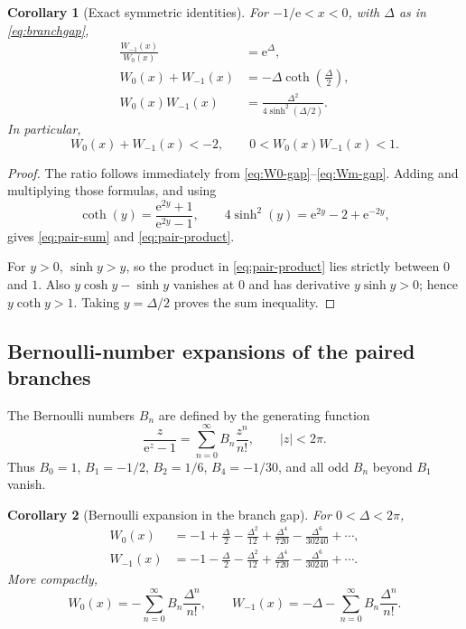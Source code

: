 \documentclass[11pt]{article}
\newtheorem{corollary}[corollary]{Corollary}
\theoremstyle{remark}
\newcommand{\Wz}{W_0}
\newcommand{\Wm}{W_{-1}}
\newcommand{\ee}{\mathrm e}
\begin{document}
\begin{corollary}[Exact symmetric identities]\label{cor:pair-symmetric}
For \(-1/\ee<x<0\), with \(\Delta\) as in
\eqref{eq:branchgap},
\begin{align}
 \frac{\Wm(x)}{\Wz(x)}&=\ee^\Delta,
 \label{eq:pair-ratio}\\
 \Wz(x)+\Wm(x)&=-\Delta\coth\left(\frac\Delta2\right),
 \label{eq:pair-sum}\\
 \Wz(x)\Wm(x)&=
 \frac{\Delta^2}{4\sinh^2(\Delta/2)}.
 \label{eq:pair-product}
\end{align}
In particular,
\begin{equation}\label{eq:pair-inequalities}
       \Wz(x)+\Wm(x)<-2,
       \qquad 0<\Wz(x)\Wm(x)<1.
\end{equation}
\end{corollary}

\begin{proof}
The ratio follows immediately from
\eqref{eq:W0-gap}--\eqref{eq:Wm-gap}.  Adding and multiplying those
formulas, and using
\[
 \coth(y)=\frac{\ee^{2y}+1}{\ee^{2y}-1},
 \qquad
 4\sinh^2(y)=\ee^{2y}-2+\ee^{-2y},
\]
gives \eqref{eq:pair-sum} and \eqref{eq:pair-product}.

For \(y>0\), \(\sinh y>y\), so the product in
\eqref{eq:pair-product} lies strictly between \(0\) and \(1\).  Also
\(y\cosh y-\sinh y\) vanishes at \(0\) and has derivative
\(y\sinh y>0\); hence \(y\coth y>1\).  Taking \(y=\Delta/2\)
proves the sum inequality.
\end{proof}

\subsection{Bernoulli-number expansions of the paired branches}

The Bernoulli numbers \(B_n\) are defined by the generating function
\begin{equation}\label{eq:bernoulli-gen}
       \frac{z}{\ee^z-1}
       =\sum_{n=0}^{\infty}B_n\frac{z^n}{n!},
       \qquad |z|<2\pi.
\end{equation}
Thus \(B_0=1\), \(B_1=-1/2\), \(B_2=1/6\),
\(B_4=-1/30\), and all odd \(B_n\) beyond \(B_1\) vanish.

\begin{corollary}[Bernoulli expansion in the branch gap]
For \(0<\Delta<2\pi\),
\begin{align}
 \Wz(x)
 &=-1+\frac\Delta2-\frac{\Delta^2}{12}
   +\frac{\Delta^4}{720}-\frac{\Delta^6}{30240}+\cdots,
 \label{eq:W0-Bernoulli}\\
 \Wm(x)
 &=-1-\frac\Delta2-\frac{\Delta^2}{12}
   +\frac{\Delta^4}{720}-\frac{\Delta^6}{30240}+\cdots.
 \label{eq:Wm-Bernoulli}
\end{align}
More compactly,
\begin{equation}\label{eq:pair-Bernoulli-general}
 \Wz(x)=-\sum_{n=0}^{\infty}B_n\frac{\Delta^n}{n!},
 \qquad
 \Wm(x)=-\Delta-
          \sum_{n=0}^{\infty}B_n\frac{\Delta^n}{n!}.
\end{equation}
\end{corollary}
\end{document}

